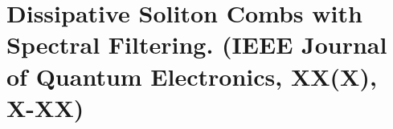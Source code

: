 \chapter{Dissipative Soliton Combs with Spectral Filtering. (IEEE Journal of Quantum Electronics, XX(X), X-XX)}
